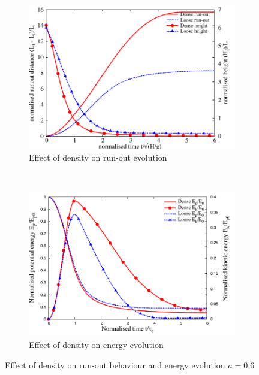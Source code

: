 \begin{figure}[tbhp]
\centering
\begin{subfigure}[b]{0.95\textwidth}
\includegraphics[width=\textwidth]{runout_height_dense_a6}
\caption{Effect of density on run-out evolution}
\label{fig:runout_height_dense_a6}
\end{subfigure}
\\
\begin{subfigure}[b]{0.95\textwidth}
\centering
\includegraphics[width=\textwidth]{Energy_dense_a6}
\caption{Effect of density on energy evolution}
\label{fig:Energy_dense_a6}
\end{subfigure}
\caption{Effect of density on run-out behaviour and energy evolution $a = 
0.6$}
\label{fig:Density_a6}
\end{figure}

